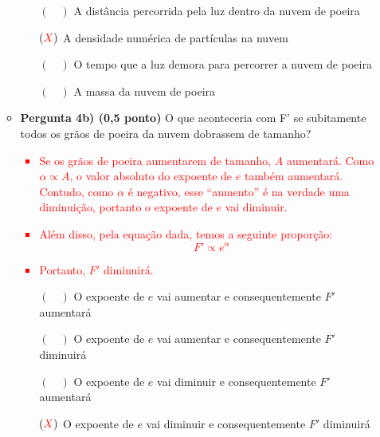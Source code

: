 \documentclass[a4paper, 12pt]{article}
\newcommand{\red}[1]{\textcolor{red}{#1}}
\begin{document}
\begin{flushleft}
\begin{itemize}
\begin{itemize}
                        \begin{itemize}
                            \item[$(\quad)$] A distância percorrida pela luz dentro da nuvem de poeira
                            \item[$(\red{X})$] A densidade numérica de partículas na nuvem
                            \item[$(\quad)$] O tempo que a luz demora para percorrer a nuvem de poeira
                            \item[$(\quad)$] A massa da nuvem de poeira
                        \end{itemize}
                    \item \textbf{Pergunta 4b) (0,5 ponto)} O que aconteceria com F' se subitamente todos os grãos de poeira da nuvem dobrassem de tamanho?
                        \red{\begin{itemize}
                            \item Se os grãos de poeira aumentarem de tamanho, $A$ aumentará. Como $\alpha \propto A$, o valor absoluto do expoente de $e$ também aumentará. Contudo, como $\alpha$ é negativo, esse ``aumento'' é na verdade uma diminuição, portanto o expoente de $e$ vai diminuir.
                            \item Além disso, pela equação dada, temos a seguinte proporção:
                                \begin{equation*}
                                    F' \propto e^\alpha
                                \end{equation*}
                            \item Portanto, $F'$ diminuirá.
                        \end{itemize}}
                        \begin{itemize}
                            \item[$(\quad)$] O expoente de $e$ vai aumentar e consequentemente $F'$ aumentará
                            \item[$(\quad)$] O expoente de $e$ vai aumentar e consequentemente $F'$ diminuirá
                            \item[$(\quad)$] O expoente de $e$ vai diminuir e consequentemente $F'$ aumentará
                            \item[$(\red{X})$] O expoente de $e$ vai diminuir e consequentemente $F'$ diminuirá
                        \end{itemize}
                \end{itemize}


\end{itemize}
\end{flushleft}
\end{document}
